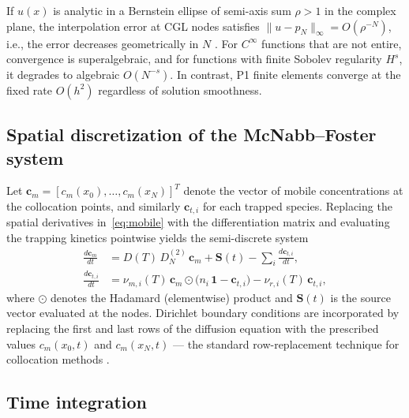 If $u(x)$ is analytic in a Bernstein ellipse of semi-axis sum $\rho > 1$ in the complex plane, the interpolation error at CGL nodes satisfies $\|u - p_N\|_\infty = O(\rho^{-N})$, i.e., the error decreases geometrically in $N$ \cite{trefethen2000,boyd2001}. For $C^\infty$ functions that are not entire, convergence is superalgebraic, and for functions with finite Sobolev regularity $H^s$, it degrades to algebraic $O(N^{-s})$. In contrast, P1 finite elements converge at the fixed rate $O(h^2)$ regardless of solution smoothness.

\subsection{Spatial discretization of the McNabb--Foster system}

Let $\mathbf{c}_m = [c_m(x_0), \ldots, c_m(x_N)]^T$ denote the vector of mobile concentrations at the collocation points, and similarly $\mathbf{c}_{t,i}$ for each trapped species. Replacing the spatial derivatives in~\eqref{eq:mobile} with the differentiation matrix and evaluating the trapping kinetics pointwise yields the semi-discrete system
\begin{align}
  \frac{d\mathbf{c}_m}{dt}
    &= D(T)\,D_N^{(2)}\,\mathbf{c}_m
       + \mathbf{S}(t)
       - \sum_i \frac{d\mathbf{c}_{t,i}}{dt},
  \label{eq:semidisc-mobile} \\[4pt]
  \frac{d\mathbf{c}_{t,i}}{dt}
    &= \nu_{m,i}(T)\,\mathbf{c}_m \odot \bigl(n_i\,\mathbf{1} - \mathbf{c}_{t,i}\bigr)
       - \nu_{r,i}(T)\,\mathbf{c}_{t,i},
  \label{eq:semidisc-trapped}
\end{align}
where $\odot$ denotes the Hadamard (elementwise) product and $\mathbf{S}(t)$ is the source vector evaluated at the nodes. Dirichlet boundary conditions are incorporated by replacing the first and last rows of the diffusion equation with the prescribed values $c_m(x_0,t)$ and $c_m(x_N,t)$ --- the standard row-replacement technique for collocation methods \cite{trefethen2000}.

\subsection{Time integration}\label{sec:time-integration}

